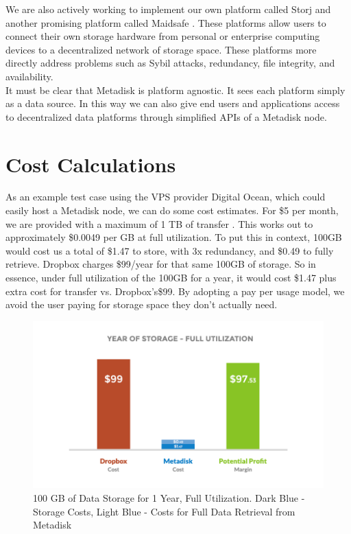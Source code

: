 \documentclass[a4paper,10pt]{article}
\begin{document}
We are also actively working to implement our own platform called Storj \cite{7} and another promising platform called Maidsafe \cite{1}. These platforms allow users to connect their own storage hardware from personal or enterprise computing devices to a decentralized network of storage space. These platforms more directly address problems such as Sybil attacks, redundancy, file integrity, and availability.  \\

It must be clear that Metadisk is platform agnostic. It sees each platform simply as a data source. In this way we can also give end users and applications access to decentralized data platforms through simplified APIs of a Metadisk node. 

\section*{Cost Calculations}

As an example test case using the VPS provider Digital Ocean, which could easily host a Metadisk node, we can do some cost estimates. For \$5 per month, we are provided with a maximum of 1 TB of transfer \cite{8}. This works out to approximately \$0.0049 per GB at full utilization. To put this in context, 100GB would cost us a total of \$1.47 to store, with 3x redundancy, and \$0.49 to fully retrieve.  Dropbox charges \$99/year for that same 100GB of storage. So in essence, under full utilization of the 100GB for a year, it would cost \$1.47 plus extra cost for transfer vs. Dropbox’s\$99.  By adopting a pay per usage model, we avoid the user  paying for storage space they don’t actually need.\\

\begin{figure}[h!]
  \centering
      \includegraphics[width=\linewidth]{04}
  \caption{100 GB of Data Storage for 1 Year, Full Utilization. Dark Blue - Storage Costs, Light Blue - Costs for Full Data Retrieval from Metadisk}
\end{figure}
\end{document}
